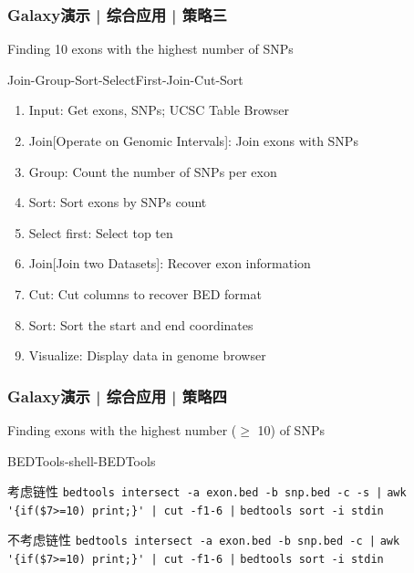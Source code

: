 \begin{frame}
  \frametitle{Galaxy演示 | \alert{综合应用} | 策略三}
  \begin{block}{Finding 10 exons with the highest number of SNPs}
    \pause
    \begin{block}{Join-Group-Sort-SelectFirst-Join-Cut-Sort}
    \pause
  \begin{enumerate}[<+-|alert@+>]
    \item Input: Get exons, SNPs; UCSC Table Browser
    \item Join[Operate on Genomic Intervals]: Join exons with SNPs
    \item Group: Count the number of SNPs per exon 
    \item Sort: Sort exons by SNPs count
    \item Select first: Select top ten
    \item Join[Join two Datasets]: Recover exon information
    \item Cut: Cut columns to recover BED format
    \item Sort: Sort the start and end coordinates
    \item Visualize: Display data in genome browser
  \end{enumerate}
\end{block}
  \end{block}
\end{frame}

\begin{frame}[fragile]
  \frametitle{Galaxy演示 | 综合应用 | 策略四}
  \begin{block}{Finding exons with the highest number ($\geq$ 10) of SNPs}
    \pause
    \begin{block}{BEDTools-shell-BEDTools}
    \pause
    \begin{block}{考虑链性}
      \verb+bedtools intersect -a exon.bed -b snp.bed -c -s |+
      \verb+awk '{if($7>=10) print;}' | cut -f1-6 |+
      \verb+bedtools sort -i stdin+
    \end{block}
    \pause
    \begin{block}{不考虑链性}
      \verb+bedtools intersect -a exon.bed -b snp.bed -c |+
      \verb+awk '{if($7>=10) print;}' | cut -f1-6 |+
      \verb+bedtools sort -i stdin+
    \end{block}
\end{block}
  \end{block}
\end{frame}


